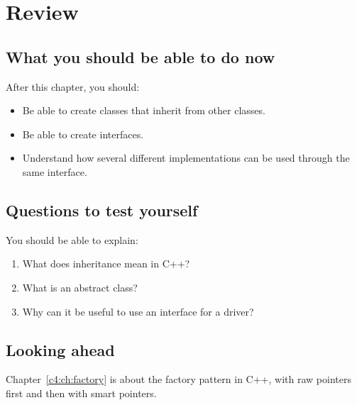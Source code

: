 
\section{Review}
\label{c3:sec:review}

\subsection*{What you should be able to do now}
After this chapter, you should:
\begin{itemize}
  \item Be able to create classes that inherit from other classes.
  \item Be able to create interfaces.
  \item Understand how several different implementations can be used through the same interface.
\end{itemize}

\subsection*{Questions to test yourself}
You should be able to explain:
\begin{enumerate}
  \item What does inheritance mean in C++?
  \item What is an abstract class?
  \item Why can it be useful to use an interface for a driver?
\end{enumerate}

\subsection*{Looking ahead}
Chapter~\ref{c4:ch:factory} is about the factory pattern in C++, with raw pointers first and then
with smart pointers.

